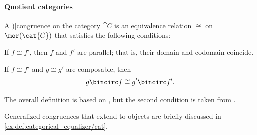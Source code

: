 \paragraph{Quotient categories}

\begin{definition}\label{def:congruence_in_category}\mimprovised
  A \term[en=congruence (\cite[def. 4.12]{Awodey2010CategoryTheory})]{congruence} on the \hyperref[def:category]{category} \( \cat{C} \) is an \hyperref[def:equivalence_relation]{equivalence relation} \( {\cong} \) on \( \mor(\cat{C}) \) that satisfies the following conditions:
  \begin{thmenum}
     If \( f \cong f' \), then \( f \) and \( f' \) are parallel; that is, their domain and codomain coincide.

     If \( f \cong f' \) and \( g \cong g' \) are composable, then
    \begin{equation*}
      g \bincirc f \cong g' \bincirc f'.
    \end{equation*}
  \end{thmenum}
\end{definition}
\begin{comments}
  \item The overall definition is based on \cite[def. 4.12]{Awodey2010CategoryTheory}, but the second condition is taken from \cite[\S 6.4.1]{Schubert1972Categories}.

  \item Generalized congruences that extend to objects are briefly discussed in \cref{ex:def:categorical_equalizer/cat}.
\end{comments}

